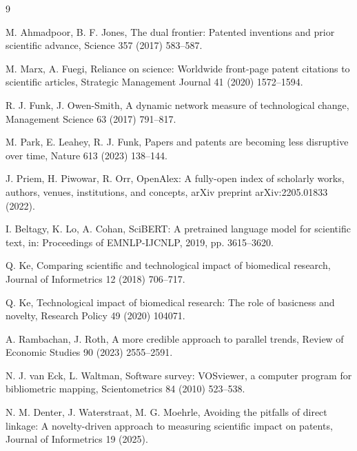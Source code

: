 \documentclass[
]{ceurart}
\begin{document}
\begin{thebibliography}{9}

M. Ahmadpoor, B. F. Jones,
The dual frontier: Patented inventions and prior scientific advance,
Science 357 (2017) 583--587.

M. Marx, A. Fuegi,
Reliance on science: Worldwide front-page patent citations to scientific articles,
Strategic Management Journal 41 (2020) 1572--1594.

R. J. Funk, J. Owen-Smith,
A dynamic network measure of technological change,
Management Science 63 (2017) 791--817.

M. Park, E. Leahey, R. J. Funk,
Papers and patents are becoming less disruptive over time,
Nature 613 (2023) 138--144.

J. Priem, H. Piwowar, R. Orr,
OpenAlex: A fully-open index of scholarly works, authors, venues, institutions, and concepts,
arXiv preprint arXiv:2205.01833 (2022).

I. Beltagy, K. Lo, A. Cohan,
SciBERT: A pretrained language model for scientific text,
in: Proceedings of EMNLP-IJCNLP, 2019, pp. 3615--3620.

Q. Ke,
Comparing scientific and technological impact of biomedical research,
Journal of Informetrics 12 (2018) 706--717.

Q. Ke,
Technological impact of biomedical research: The role of basicness and novelty,
Research Policy 49 (2020) 104071.

A. Rambachan, J. Roth,
A more credible approach to parallel trends,
Review of Economic Studies 90 (2023) 2555--2591.

N. J. van Eck, L. Waltman,
Software survey: VOSviewer, a computer program for bibliometric mapping,
Scientometrics 84 (2010) 523--538.

N. M. Denter, J. Waterstraat, M. G. Moehrle,
Avoiding the pitfalls of direct linkage: A novelty-driven approach to measuring scientific impact on patents,
Journal of Informetrics 19 (2025).

\end{thebibliography}
\end{document}
